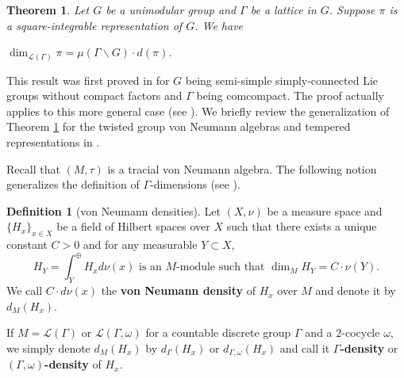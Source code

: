 \documentclass[11pt]{article}
\theoremstyle{plain}
\newtheorem{theorem}{Theorem}[section]
\theoremstyle{remark}
\theoremstyle{definition}
\newtheorem{definition}{Definition}[section]
\begin{document}





\begin{theorem}\label{tAS}
Let $G$ be a unimodular group and $\Gamma$ be a lattice in $G$. 
Suppose $\pi$ is a square-integrable representation of $G$. 
We have
\begin{center}
    $\dim_{\mathcal{L}(\Gamma)}\pi=\mu(\Gamma\backslash G)\cdot d(\pi)$.
\end{center}
\end{theorem}
This result was first proved in \cite[\S 3]{AS77} for $G$ being semi-simple simply-connected Lie groups without compact factors and $\Gamma$ being comcompact. 
The proof actually applies to this more general case (see \cite[Theorem 3.3.2]{GHJ}). 
We briefly review the generalization of Theorem \ref{tAS} for the twisted group von Neumann algebras and tempered representations in \cite{Y25AS}. 


Recall that $(M,\tau)$ is a tracial von Neumann algebra. 
The following notion generalizes the definition of $\Gamma$-dimensions (see \cite[\S 1]{LuckL2book}). 
\begin{definition}[von Neumann densities]\label{dvnden}
Let $(X,\nu)$ be a measure space and $\{H_x\}_{x\in X}$ be a field of Hilbert spaces over $X$ such that there exists a unique constant $C>0$ and for any measurable $Y\subset X$, 
\begin{equation} 
H_Y=\int_{Y}^{\oplus }H_{x}d\nu(x) \text{~is an~} M\text{-module}  \text{~such that~}
    \dim_{M}H_Y=C\cdot \nu(Y). 
\end{equation}
We call $C\cdot d\nu(x)$ the \textbf{von Neumann density} of $H_x$ over $M$ and denote it by $d_{M}(H_x)$. 

If $M=\mathcal{L}(\Gamma)$ or $\mathcal{L}(\Gamma,\omega)$ for a countable discrete group $\Gamma$ and a $2$-cocycle $\omega$, we simply denote $d_{M}(H_x)$ by $ d_{\Gamma}(H_x)$ or $d_{\Gamma,\omega}(H_x)$ and call it \textbf{$\Gamma$-density} or \textbf{$(\Gamma,\omega)$-density} of $H_x$.    
\end{definition}
\end{document}
